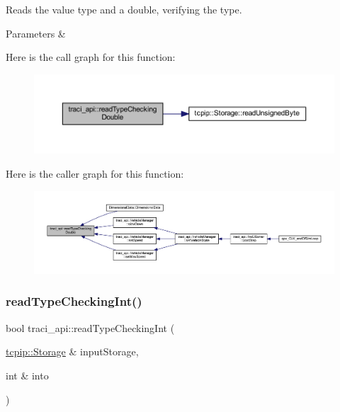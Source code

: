 Reads the value type and a double, verifying the type. 


\begin{DoxyParams}{Parameters}
{\em } & \\
\hline
\end{DoxyParams}
Here is the call graph for this function\+:
\nopagebreak
\begin{figure}[H]
\begin{center}
\leavevmode
\includegraphics[width=350pt]{namespacetraci__api_a5229be0b43fc9f5d9f413d5e51924b50_cgraph}
\end{center}
\end{figure}
Here is the caller graph for this function\+:
\nopagebreak
\begin{figure}[H]
\begin{center}
\leavevmode
\includegraphics[width=350pt]{namespacetraci__api_a5229be0b43fc9f5d9f413d5e51924b50_icgraph}
\end{center}
\end{figure}
\mbox{\label{namespacetraci__api_a57c1a8583619eb1e9984249249435f8e}} 
\subsubsection{\texorpdfstring{read\+Type\+Checking\+Int()}{readTypeCheckingInt()}}
{\footnotesize\ttfamily bool traci\+\_\+api\+::read\+Type\+Checking\+Int (\begin{DoxyParamCaption}\item[{\hyperlink{classtcpip_1_1_storage}{tcpip\+::\+Storage} \&}]{input\+Storage,  }\item[{int \&}]{into }\end{DoxyParamCaption})}



